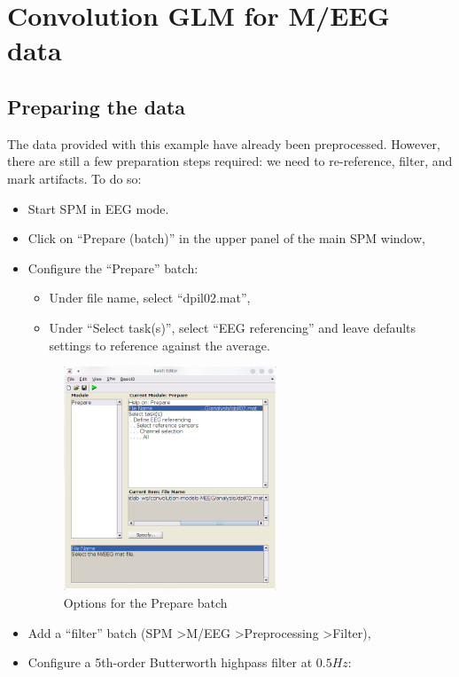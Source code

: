 \section{Convolution GLM for M/EEG data}

	\subsection{Preparing the data}
		The data provided with this example have already been preprocessed. However, there are still a few preparation steps required: we need to re-reference, filter, and mark artifacts. To do so: 
		\begin{itemize}
		 	\item Start SPM in EEG mode. 
		 	\item Click on ``Prepare (batch)'' in the upper panel of the main SPM window, 
		 	\item Configure the ``Prepare'' batch: 
		 	\begin{itemize}
		 		\item Under file name, select ``dpil02.mat'', 
		 		\item Under ``Select task(s)'', select ``EEG referencing'' and leave defaults settings to reference against the average.  
		 	\end{itemize}
			 \begin{figure}[htb]
			 	\centering
			 	\includegraphics[width=0.6\textwidth]{meeg_firstlevel/figures/prepare-options.png}
			 	\caption{Options for the Prepare batch}
			 	\label{fig:meeg-firstlevel:prepare}
			 \end{figure}
		 	\item Add a ``filter'' batch (SPM \textgreater M/EEG \textgreater Preprocessing \textgreater Filter), 
		 	\item Configure a 5th-order Butterworth highpass filter at $0.5Hz$:

\end{itemize}
